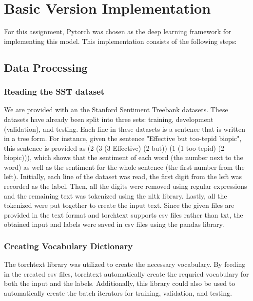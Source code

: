 \documentclass[12pt,a4paper]{article}
\begin{document}
	\section{Basic Version Implementation}
	For this assignment, Pytorch was chosen as the deep learning framework for implementing this model. This implementation consists of the following steps:
	
	\vspace{-0.3cm}
	\subsection{Data Processing}
	\subsubsection{Reading the SST dataset}
	We are provided with an the Stanford Sentiment Treebank datasets. These datasets have already been split into three sets: training, development (validation), and testing. Each line in these datasets is a sentence that is written in a tree form. For instance, given the sentence "Effective but too-tepid biopic", this sentence is provided as  (2 (3 (3 Effective) (2 but)) (1 (1 too-tepid) (2 biopic))), which shows that the sentiment of each word (the number next to the word) as well as the sentiment for the whole sentence (the first number from the left). Initially, each line of the dataset was read, the first digit from the left was recorded as the label. Then, all the digits were removed using regular expressions and the remaining text was tokenized using the nltk library. Lastly, all the tokenized were put together to create the input text. Since the given files are provided in the text format and torchtext supports csv files rather than txt, the obtained input and labels were saved in csv files using the pandas library.
	
	\subsubsection{Creating Vocabulary Dictionary}
	The torchtext library was utilized to create the necessary vocabulary. By feeding in the created csv files, torchtext automatically create the requried vocabulary for both the input and the labels. Additionally, this library could also be used to automatically create the batch iterators for training, validation, and testing.
	
\end{document}
